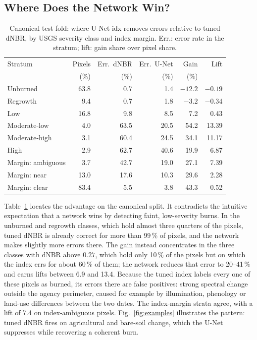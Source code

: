 \documentclass[conference]{IEEEtran}
\begin{document}
\subsection{Where Does the Network Win?}\label{sec:when}

\begin{table}[!t]
\centering
\caption{Canonical test fold: where U-Net-idx removes errors relative to tuned dNBR, by USGS severity class and index margin. Err.: error rate in the stratum; lift: gain share over pixel share.}
\label{tab:gain}
\setlength{\tabcolsep}{4pt}
\begin{tabular}{@{}lrrrrr@{}}
\toprule
Stratum & Pixels & Err.\ dNBR & Err.\ U-Net & Gain & Lift \\
 & (\%) & (\%) & (\%) & (\%) & \\
\midrule
Unburned & 63.8 & 0.7 & 1.4 & $-12.2$ & $-0.19$ \\
Regrowth & 9.4 & 0.7 & 1.8 & $-3.2$ & $-0.34$ \\
Low & 16.8 & 9.8 & 8.5 & 7.2 & 0.43 \\
Moderate-low & 4.0 & 63.5 & 20.5 & 54.2 & 13.39 \\
Moderate-high & 3.1 & 60.4 & 24.5 & 34.1 & 11.17 \\
High & 2.9 & 62.7 & 40.6 & 19.9 & 6.87 \\
\midrule
Margin: ambiguous & 3.7 & 42.7 & 19.0 & 27.1 & 7.39 \\
Margin: near & 13.0 & 17.6 & 10.3 & 29.6 & 2.28 \\
Margin: clear & 83.4 & 5.5 & 3.8 & 43.3 & 0.52 \\
\bottomrule
\end{tabular}
\end{table}

Table~\ref{tab:gain} locates the advantage on the canonical split. It contradicts the intuitive expectation that a network wins by detecting faint, low-severity burns. In the unburned and regrowth classes, which hold almost three quarters of the pixels, tuned dNBR is already correct for more than 99\,\% of pixels, and the network makes slightly more errors there. The gain instead concentrates in the three classes with dNBR above $0.27$, which hold only 10\,\% of the pixels but on which the index errs for about 60\,\% of them; the network reduces that error to 20--41\,\% and earns lifts between 6.9 and 13.4. Because the tuned index labels every one of these pixels as burned, its errors there are false positives: strong spectral change outside the agency perimeter, caused for example by illumination, phenology or land-use differences between the two dates. The index-margin strata agree, with a lift of 7.4 on index-ambiguous pixels. Fig.~\ref{fig:examples} illustrates the pattern: tuned dNBR fires on agricultural and bare-soil change, which the U-Net suppresses while recovering a coherent burn.
\end{document}
